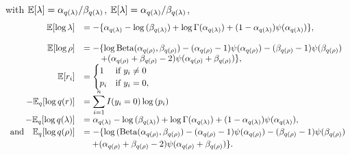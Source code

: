 \documentclass[11pt]{amsart}
\begin{document}
\noindent with 
${\mathbb E}[\lambda] = \alpha_{q(\lambda)}/\beta_{q(\lambda)}$,
${\mathbb E} [\lambda] = \alpha_{q(\lambda)}/\beta_{q(\lambda)}$,
$$
\begin{array}{rl}
	{\mathbb E} [\log{\lambda}] & \displaystyle = -\{ \alpha_{q(\lambda)} - \log{(\beta_{q(\lambda)})} + \log{\Gamma(\alpha_{q(\lambda)})} + (1 - \alpha_{q(\lambda)}) \psi{(\alpha_{q(\lambda)})} \},        \\
	\\
	{\mathbb E}[\log{\rho}]     & \displaystyle = - \{ \log{\text{Beta}(\alpha_{q(\rho)}, \beta_{q(\rho)})} - (\alpha_{q(\rho)} - 1) \psi{(\alpha_{q(\rho)})} - (\beta_{q(\rho)} - 1)\psi{(\beta_{q(\rho)})}  \\
	                    & \displaystyle \qquad + (\alpha_{q(\rho)} + \beta_{q(\rho)} - 2)\psi{(\alpha_{q(\rho)} + \beta_{q(\rho)})} \},                                                               
	\\
	{\mathbb E}[r_i]            & \displaystyle =                                                                                                                                                             
	\begin{cases}
	1                   & \text{if } y_i \ne 0                                                                                                                                              \\
	p_i                 & \text{if } y_i = 0,                                                                                                                                               \\
	\end{cases}
	\\
	-{\mathbb E}_q[\log{q(r)}]  & \displaystyle = \sum_{i=1}^n I(y_i = 0) \log{(p_i)}                                                                                                                         \\ [0.5ex]
	-{\mathbb E}_q[\log{q(\lambda)}] 
	                    & \displaystyle = \alpha_{q(\lambda)} - \log{(\beta_{q(\lambda)})} + \log{\Gamma{(\alpha_{q(\lambda)})}} + (1 - \alpha_{q(\lambda)}) \psi{(\alpha_{q(\lambda)})},             \\ [0.5ex]
	\mbox{and}\quad {\mathbb E}_q[\log{q(\rho)}] 
	                    & \displaystyle = - \{ \log{(\text{Beta}(\alpha_{q(\rho)}, \beta_{q(\rho)})} - (\alpha_{q(\rho)} - 1) \psi{(\alpha_{q(\rho)})} - (\beta_{q(\rho)} - 1)\psi{(\beta_{q(\rho)})} \\ [0.5ex]
	                    & \displaystyle \quad + (\alpha_{q(\rho)} + \beta_{q(\rho)} - 2)\psi{(\alpha_{q(\rho)} + \beta_{q(\rho)})} \}.                                                                \\ [0.5ex]
\end{array}
$$
\end{document}
